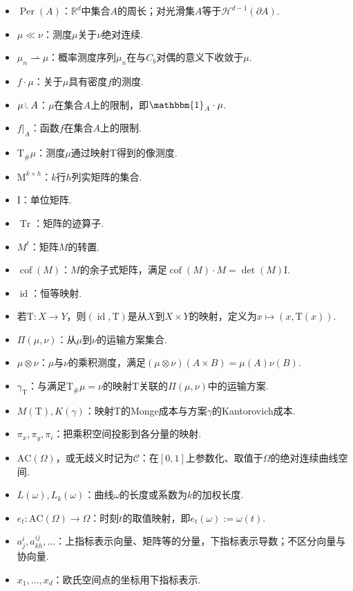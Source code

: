 \begin{itemize}
\item $\operatorname{Per}(A)$：$\mathbb R^d$中集合$A$的周长；对光滑集$A$等于$\mathscr H^{d-1}(\partial A)$.
\item $\mu\ll\nu$：测度$\mu$关于$\nu$绝对连续.
\item $\mu_n\rightharpoonup\mu$：概率测度序列$\mu_n$在与$C_b$对偶的意义下收敛于$\mu$.
\item $f\cdot\mu$：关于$\mu$具有密度$f$的测度.
\item $\mu\restr A$：$\mu$在集合$A$上的限制，即$\mathbbm{1}_A\cdot\mu$.
\item $f|_A$：函数$f$在集合$A$上的限制.
\item $\mathrm T_\#\mu$：测度$\mu$通过映射$\mathrm T$得到的像测度.
\item $\mathrm M^{k\times h}$：$k$行$h$列实矩阵的集合.
\item $\mathrm I$：单位矩阵.
\item $\operatorname{Tr}$：矩阵的迹算子.
\item $M^t$：矩阵$M$的转置.
\item $\operatorname{cof}(M)$：$M$的余子式矩阵，满足$\operatorname{cof}(M)\cdot M=\det(M)\mathrm I$.
\item $\operatorname{id}$：恒等映射.
\item 若$\mathrm T:X\to Y$，则$(\operatorname{id},\mathrm T)$是从$X$到$X\times Y$的映射，定义为$x\mapsto(x,\mathrm T(x))$.
\item $\Pi(\mu,\nu)$：从$\mu$到$\nu$的运输方案集合.
\item $\mu\otimes\nu$：$\mu$与$\nu$的乘积测度，满足$(\mu\otimes\nu)(A\times B)=\mu(A)\nu(B)$.
\item $\gamma_{\mathrm T}$：与满足$\mathrm T_\#\mu=\nu$的映射$\mathrm T$关联的$\Pi(\mu,\nu)$中的运输方案.
\item $M(\mathrm T),K(\gamma)$：映射$\mathrm T$的Monge成本与方案$\gamma$的Kantorovich成本.
\item $\pi_x,\pi_y,\pi_i$：把乘积空间投影到各分量的映射.
\item $\mathrm{AC}(\Omega)$，或无歧义时记为$\mathscr C$：在$[0,1]$上参数化、取值于$\Omega$的绝对连续曲线空间.
\item $L(\omega),L_k(\omega)$：曲线$\omega$的长度或系数为$k$的加权长度.
\item $e_t:\mathrm{AC}(\Omega)\to\Omega$：时刻$t$的取值映射，即$e_t(\omega):=\omega(t)$.
\item $a^i_j,a^{ij}_{kh},\ldots$：上指标表示向量、矩阵等的分量，下指标表示导数；不区分向量与协向量.
\item $x_1,\ldots,x_d$：欧氏空间点的坐标用下指标表示.

\end{itemize}
